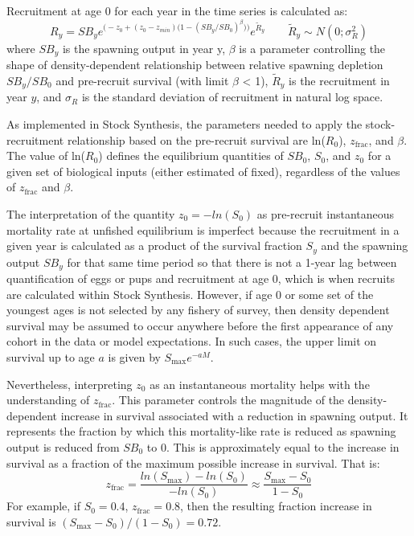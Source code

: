 Recruitment at age 0 for each year in the time series is calculated as:
\begin{equation}{ R_y = SB_ye^{\Big(-z_0 + (z_0-z_{min})\big(1-(SB_y/SB_0)^\beta \big)\Big)}e^{\tilde{R}_y}\qquad  \tilde{R}_y\sim N(0;\sigma^2_R)}
\end{equation}
where $SB_y$ is the spawning output in year y, $\beta$ is a parameter controlling the shape of density-dependent relationship between relative spawning depletion $SB_y/SB_0$ and pre-recruit survival (with limit $\beta$ < 1), $\tilde{R}_y$ is the recruitment in year $y$, and $\sigma_R$ is the standard deviation of recruitment in natural log space. 

As implemented in Stock Synthesis, the parameters needed to apply the stock-recruitment relationship based on the pre-recruit survival are ln($R_0$), $z_{\text{frac}}$, and $\beta$. The value of ln($R_0$) defines the equilibrium quantities of $SB_0$, $S_0$, and $z_0$ for a given set of biological inputs (either estimated of fixed), regardless of the values of $z_{\text{frac}}$ and $\beta$.

The interpretation of the quantity $z_0=-ln(S_0)$ as pre-recruit instantaneous mortality rate at unfished equilibrium is imperfect because the recruitment in a given year is calculated as a product of the survival fraction $S_y$ and the spawning output $SB_y$ for that same time period so that there is not a 1-year lag between quantification of eggs or pups and recruitment at age 0, which is when recruits are calculated within Stock Synthesis. However, if age 0 or some set of the youngest ages is not selected by any fishery of survey, then density dependent survival may be assumed to occur anywhere before the first appearance of any cohort in the data or model expectations. In such cases, the upper limit on survival up to age $a$ is given by $S_{\text{max}}e^{-aM}$. 

Nevertheless, interpreting $z_0$ as an instantaneous mortality helps with the understanding of $z_{\text{frac}}$. This parameter controls the magnitude of the density-dependent increase in survival associated with a reduction in spawning output. It represents the fraction by which this mortality-like rate is reduced as spawning output is reduced from $SB_0$ to 0. This is approximately equal to the increase in survival as a fraction of the maximum possible increase in survival. That is: 
\begin{equation}
z_{\text{frac}}=\frac{ln(S_{\text{max}})-ln(S_0)}{-ln(S_0)} \approx \frac{S_{\text{max}}-S_0}{1-S_0}
\end{equation}
For example, if $S_0 = 0.4$, $z_{\text{frac}}=0.8$, then the resulting fraction increase in survival is $(S_{\text{max}}-S_0)/(1-S_0)=0.72$.

